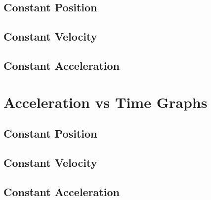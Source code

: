 		\subsection{Constant Position}
		\subsection{Constant Velocity}
		\subsection{Constant Acceleration}
	\section{Acceleration vs Time Graphs}
		\subsection{Constant Position}
		\subsection{Constant Velocity}
		\subsection{Constant Acceleration}	
	

	


